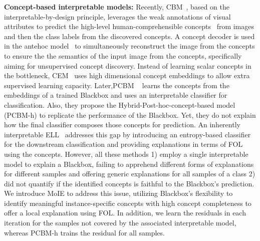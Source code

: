 \textbf{Concept-based interpretable models:}
Recently, CBM~\cite{koh2020concept}, based on the interpretable-by-design principle, leverages the weak annotations of visual attributes to predict the high-level human-comprehensible concepts~\cite{kim2017interpretability} from images and then the class labels from the discovered concepts. A concept decoder is used in the antehoc model~\cite{sarkar2021inducing} to simultaneously reconstruct the image from the concepts to ensure the the semantics of the input image from the concepts, specifically aiming for unsupervised concept discovery. Instead of learning scalar concepts in the bottleneck, CEM~\cite{zarlenga2022concept} uses high dimensional concept embeddings to allow extra supervised learning capacity. Later,PCBM ~\cite{yuksekgonul2022post} learns the concepts from the embeddings of a trained Blackbox and uses an interpretable classifier for classification. Also, they propose the Hybrid-Post-hoc-concept-based model (PCBM-h) to replicate the performance of the Blackbox. Yet, they do not explain how the final classifier composes those concepts for prediction. An inherently interpretable ELL~\cite{barbiero2022entropy} addresses this gap by introducing an entropy-based classifier for the downstream classification and providing explanations in terms of FOL using the concepts. However, all these methods 1) employ a single interpretable model to explain a Blackbox, failing to apprehend different forms of explanations for different samples and offering generic explanations for all samples of a class 2) did not quantify if the identified concepts is faithful to the Blackbox's prediction. We introduce MoIE to address this issue, utilizing Blackbox's flexibility to identify meaningful instance-specific concepts with high concept completeness to offer a local explanation using FOL. In addition, we learn the residuals in each iteration for the samples not covered by the associated interpretable model, whereas PCBM-h trains the residual for all samples.

